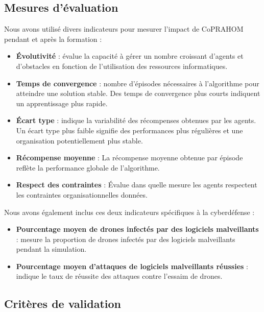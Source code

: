 \subsection{Mesures d'évaluation}

Nous avons utilisé divers indicateurs pour mesurer l'impact de CoPRAHOM pendant et après la formation :
\begin{itemize}
    \item \textbf{Évolutivité} : évalue la capacité à gérer un nombre croissant d'agents et d'obstacles en fonction de l'utilisation des ressources informatiques.
    \item \textbf{Temps de convergence} : nombre d'épisodes nécessaires à l'algorithme pour atteindre une solution stable. Des temps de convergence plus courts indiquent un apprentissage plus rapide.
    \item \textbf{Écart type} : indique la variabilité des récompenses obtenues par les agents. Un écart type plus faible signifie des performances plus régulières et une organisation potentiellement plus stable.
    \item \textbf{Récompense moyenne} : La récompense moyenne obtenue par épisode reflète la performance globale de l'algorithme.
    \item \textbf{Respect des contraintes} : Évalue dans quelle mesure les agents respectent les contraintes organisationnelles données. %
\end{itemize}

Nous avons également inclus ces deux indicateurs spécifiques à la cyberdéfense :
\begin{itemize}
    \item \textbf{Pourcentage moyen de drones infectés par des logiciels malveillants} : mesure la proportion de drones infectés par des logiciels malveillants pendant la simulation.
    \item \textbf{Pourcentage moyen d'attaques de logiciels malveillants réussies} : indique le taux de réussite des attaques contre l'essaim de drones.
\end{itemize}

\subsection{Critères de validation}


